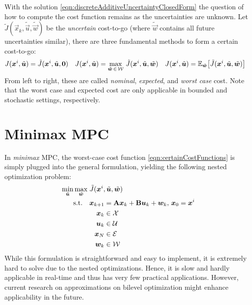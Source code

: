 	With the solution \eqref{eqn:discreteAdditiveUncertaintyClosedForm} the question of how to compute the cost function remains as the uncertainties are unknown. Let \( \tilde{J}(\vec{x}_k, \tilde{\vec{u}}, \tilde{\vec{w}}) \) be the \emph{uncertain} cost-to-go (where \( \tilde{\vec{w}} \) contains all future uncertainties similar), there are three fundamental methods to form a certain cost-to-go:
	\begin{align}
		J(\bm{x}^i, \tilde{\bm{u}}) & = \tilde{J}(\bm{x}^i, \tilde{\bm{u}}, \bm{0})                                                      &
		J(\bm{x}^i, \tilde{\bm{u}}) & = \max_{\tilde{\bm{w}} \,\in\, \mathcal{W}}\, \tilde{J}(\bm{x}^i, \tilde{\bm{u}}, \tilde{\bm{w}}) &
		J(\bm{x}^i, \tilde{\bm{u}}) & = \mathbb{E}_{\tilde{\bm{w}}}\bigl[ \tilde{J}(\bm{x}^i, \tilde{\bm{u}}, \tilde{\bm{w}}) \bigr]
		\label{eqn:certainCostFunctions}
	\end{align}
	From left to right, these are called \emph{nominal}, \emph{expected}, and \emph{worst case} cost. Note that the worst case and expected cost are only applicable in bounded and stochastic settings, respectively.

	\section{Minimax MPC}
		In \emph{minimax} MPC, the worst-case cost function \eqref{eqn:certainCostFunctions} is simply plugged into the general formulation, yielding the following nested optimization problem:
		\begin{equation}
			\begin{aligned}
				\min_{\tilde{\bm{u}}} \max_{\tilde{\bm{w}}}\; & \tilde{J}(\bm{x}^i, \tilde{\bm{u}}, \tilde{\bm{w}}) \\
				\text{s.t.}\quad                                &
				\begin{aligned}[t]
					\bm{x}_{k + 1} & = \bm{\mathrm{A}} \bm{x}_k + \bm{\mathrm{B}} \bm{u}_k + \bm{w}_k,\, \bm{x}_0 = \bm{x}^i \\
					\bm{x}_k       & \in \mathcal{X}                                                              \\
					\bm{u}_k       & \in \mathcal{U}                                                              \\
					\bm{x}_N       & \in \mathcal{E}                                                              \\
					\bm{w}_k       & \in \mathcal{W}
				\end{aligned}
			\end{aligned}
		\end{equation}
		While this formulation is straightforward and easy to implement, it is extremely hard to solve due to the nested optimizations. Hence, it is slow and hardly applicable in real-time and thus has very few practical applications. However, current research on approximations on bilevel optimization might enhance applicability in the future.

